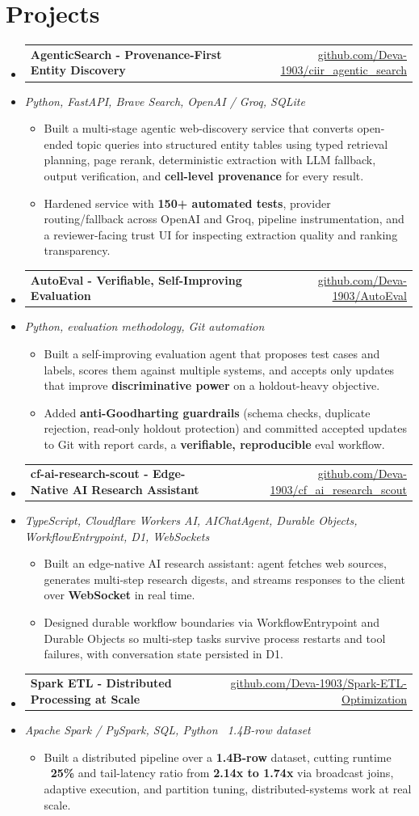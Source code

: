 \documentclass[letterpaper,10pt]{article}
\makeatletter
\newcommand{\resumeItem}[1]{
  \item\small{#1\vspace{-1pt}}
}
\newcommand{\resumeProjectHeading}[2]{
    \item
    \begin{tabular*}{0.985\textwidth}[t]{l@{\extracolsep{\fill}}r}
      \small\textbf{#1} & \small #2 \\
    \end{tabular*}\vspace{-5pt}
}
\newcommand{\resumeProjectSubheading}[1]{
  \vspace{-2pt}\item[] {\small\textcolor{ResumeSlate}{\emph{#1}}}\vspace{-3pt}
}
\newcommand{\resumeSubHeadingListStart}{\begin{itemize}[leftmargin=0.0in, label={}, itemsep=2pt, topsep=2pt]}
\newcommand{\resumeSubHeadingListEnd}{\end{itemize}}
\newcommand{\resumeItemListStart}{\begin{itemize}[leftmargin=0.18in, itemsep=2pt, topsep=1pt]}
\newcommand{\resumeItemListEnd}{\end{itemize}\vspace{-4pt}}
\makeatother
\begin{document}
\section{Projects}
\resumeSubHeadingListStart
  \resumeProjectHeading
    {AgenticSearch - Provenance-First Entity Discovery}
    {\href{https://github.com/Deva-1903/ciir_agentic_search}{github.com/Deva-1903/ciir\_agentic\_search}}
  \resumeProjectSubheading{Python, FastAPI, Brave Search, OpenAI / Groq, SQLite}
    \resumeItemListStart
      \resumeItem{Built a multi-stage agentic web-discovery service that converts open-ended topic queries into structured entity tables using typed retrieval planning, page rerank, deterministic extraction with LLM fallback, output verification, and \textbf{cell-level provenance} for every result.}
      \resumeItem{Hardened service with \textbf{150+ automated tests}, provider routing/fallback across OpenAI and Groq, pipeline instrumentation, and a reviewer-facing trust UI for inspecting extraction quality and ranking transparency.}
    \resumeItemListEnd
  \resumeProjectHeading
    {AutoEval - Verifiable, Self-Improving Evaluation}
    {\href{https://github.com/Deva-1903/AutoEval}{github.com/Deva-1903/AutoEval}}
  \resumeProjectSubheading{Python, evaluation methodology, Git automation}
    \resumeItemListStart
      \resumeItem{Built a self-improving evaluation agent that proposes test cases and labels, scores them against multiple systems, and accepts only updates that improve \textbf{discriminative power} on a holdout-heavy objective.}
      \resumeItem{Added \textbf{anti-Goodharting guardrails} (schema checks, duplicate rejection, read-only holdout protection) and committed accepted updates to Git with report cards, a \textbf{verifiable, reproducible} eval workflow.}
    \resumeItemListEnd
  \resumeProjectHeading
    {cf-ai-research-scout - Edge-Native AI Research Assistant}
    {\href{https://github.com/Deva-1903/cf_ai_research_scout}{github.com/Deva-1903/cf\_ai\_research\_scout}}
  \resumeProjectSubheading{TypeScript, Cloudflare Workers AI, AIChatAgent, Durable Objects, WorkflowEntrypoint, D1, WebSockets}
    \resumeItemListStart
      \resumeItem{Built an edge-native AI research assistant: agent fetches web sources, generates multi-step research digests, and streams responses to the client over \textbf{WebSocket} in real time.}
      \resumeItem{Designed durable workflow boundaries via WorkflowEntrypoint and Durable Objects so multi-step tasks survive process restarts and tool failures, with conversation state persisted in D1.}
    \resumeItemListEnd
  \resumeProjectHeading
    {Spark ETL - Distributed Processing at Scale}
    {\href{https://github.com/Deva-1903/Spark-ETL-Optimization}{github.com/Deva-1903/Spark-ETL-Optimization}}
  \resumeProjectSubheading{Apache Spark / PySpark, SQL, Python \enspace\textbar\enspace ~1.4B-row dataset}
    \resumeItemListStart
      \resumeItem{Built a distributed pipeline over a \textbf{1.4B-row} dataset, cutting runtime \textbf{~25\%} and tail-latency ratio from \textbf{2.14x to 1.74x} via broadcast joins, adaptive execution, and partition tuning, distributed-systems work at real scale.}
    \resumeItemListEnd
\resumeSubHeadingListEnd
\vspace{-4pt}
\end{document}
